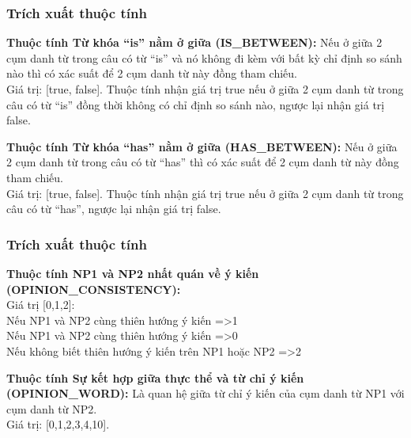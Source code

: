 \documentclass{beamer}
\begin{document}
\begin{frame}
\frametitle{Trích xuất thuộc tính}

\begin{block}{}
\textbf{Thuộc tính Từ khóa “is” nằm ở giữa (IS\_BETWEEN):} Nếu ở giữa 2 cụm danh từ trong câu có từ “is” và nó không đi kèm với bất kỳ chỉ định so sánh nào thì có xác suất để 2 cụm danh từ này đồng tham chiếu.
\\Giá trị: [true, false]. Thuộc tính nhận giá trị true nếu ở giữa 2 cụm danh từ trong câu có từ “is” đồng thời không có chỉ định so sánh nào, ngược lại nhận giá trị false.
\end{block}

\begin{block}{}
\textbf{Thuộc tính Từ khóa “has” nằm ở giữa (HAS\_BETWEEN):} Nếu ở giữa 2 cụm danh từ trong câu có từ “has” thì có xác suất để 2 cụm danh từ này đồng tham chiếu.
\\Giá trị: [true, false]. Thuộc tính nhận giá trị true nếu ở giữa 2 cụm danh từ trong câu có từ “has”, ngược lại nhận giá trị false.
\end{block}

\end{frame}

\begin{frame}
\frametitle{Trích xuất thuộc tính}

\begin{block}{}
\textbf{Thuộc tính NP1 và NP2 nhất quán về ý kiến (OPINION\_CONSISTENCY):}
\\Giá trị [0,1,2]:
\\Nếu NP1 và NP2 cùng thiên hướng ý kiến =>1
\\Nếu NP1 và NP2 cùng thiên hướng ý kiến =>0
\\Nếu không biết thiên hướng ý kiến trên NP1 hoặc NP2 =>2

\end{block}

\begin{block}{}
\textbf{Thuộc tính Sự kết hợp giữa thực thể và từ chỉ ý kiến (OPINION\_WORD):} Là quan hệ giữa từ chỉ ý kiến của cụm danh từ NP1 với cụm danh từ NP2.
\\Giá trị: [0,1,2,3,4,10].
\end{block}

\end{frame}
\end{document}
